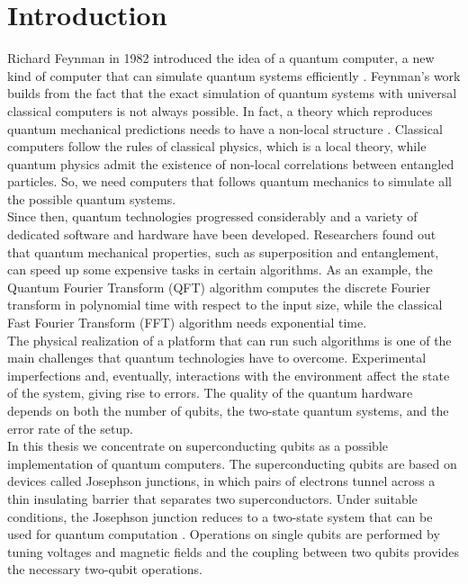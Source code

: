 \documentclass[../main/main.tex]{subfiles}
\begin{document}
\chapter*{Introduction}

Richard Feynman in 1982 introduced the idea of a quantum computer, a new kind of computer that can simulate quantum systems efficiently \cite{Feynman1982}. Feynman's work builds from the fact that the exact simulation of quantum systems with universal classical computers is not always possible. In fact, a theory which reproduces quantum mechanical predictions needs to have a non-local structure \cite{PhysicsPhysiqueFizika.1.195}. Classical computers follow the rules of classical physics, which is a local theory, while quantum physics admit the existence of non-local correlations between entangled particles. So, we need computers that follows quantum mechanics to simulate all the possible quantum systems.\\
Since then, quantum technologies progressed considerably and a variety of dedicated software and hardware have been developed. Researchers found out that quantum mechanical properties, such as superposition and entanglement, can speed up some expensive tasks in certain algorithms. As an example, the Quantum Fourier Transform (QFT) algorithm \cite{coppersmith2002approximate} computes the discrete Fourier transform in polynomial time with respect to the input size, while the classical Fast Fourier Transform (FFT) algorithm needs exponential time.\\
The physical realization of a platform that can run such algorithms is one of the main challenges that quantum technologies have to overcome. Experimental imperfections and, eventually, interactions with the environment affect the state of the system, giving rise to errors. The quality of the quantum hardware depends on both the number of qubits, the two-state quantum systems, and the error rate of the setup.\\
In this thesis we concentrate on superconducting qubits as a possible implementation of quantum computers. The superconducting qubits are based on devices called Josephson junctions, in which pairs of electrons tunnel across a thin insulating barrier that separates two superconductors. Under suitable conditions, the Josephson junction reduces to a two-state system that can be used for quantum computation \cite{RevModPhys.73.357}. Operations on single qubits are performed by tuning voltages and magnetic fields and the coupling between two qubits provides the necessary two-qubit operations.\\
\end{document}
